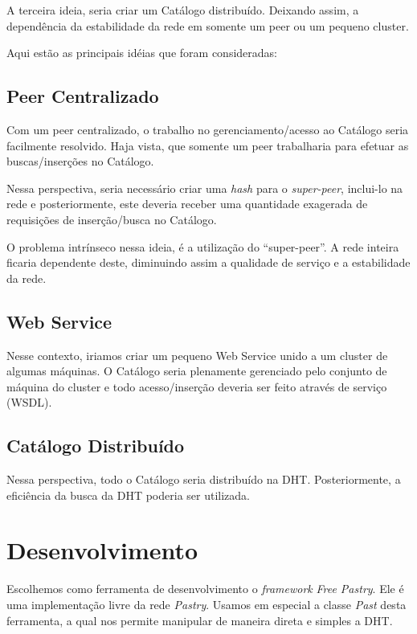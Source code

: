 \documentclass{acm_proc_article-sp}
\begin{document}
A terceira ideia, seria criar um Catálogo distribuído. Deixando assim, a dependência da estabilidade da rede em somente um peer ou um pequeno cluster.

Aqui estão as principais idéias que foram consideradas:

\subsection{Peer Centralizado}

Com um peer centralizado, o trabalho no gerenciamento/acesso ao Catálogo seria facilmente resolvido. Haja vista, que somente um peer trabalharia para efetuar as buscas/inserções no Catálogo. 

Nessa perspectiva, seria necessário criar uma \textit{hash} para o \textit{super-peer}, inclui-lo na rede e posteriormente, este deveria receber uma quantidade exagerada de requisições de inserção/busca no Catálogo.

O problema intrínseco nessa ideia, é a utilização do “super-peer”. A rede inteira ficaria dependente deste, diminuindo assim a qualidade de serviço e a estabilidade da rede.

\subsection{Web Service}

Nesse contexto, iriamos criar um pequeno Web Service unido a um cluster de algumas máquinas. O Catálogo seria plenamente gerenciado pelo conjunto de máquina do cluster e todo acesso/inserção deveria ser feito através de serviço (WSDL).

\subsection{Catálogo Distribuído}

Nessa perspectiva, todo o Catálogo seria distribuído na DHT. Posteriormente, a 
eficiência da  busca da DHT poderia ser utilizada.


\section{Desenvolvimento}

Escolhemos como ferramenta de desenvolvimento o \textit{framework} \textit{Free Pastry}\cite{website:free-pastry}. Ele é uma implementação livre da rede \textit{Pastry}. Usamos em especial a classe \textit{Past} desta ferramenta, a qual nos permite manipular de maneira direta e simples a DHT.
\end{document}
